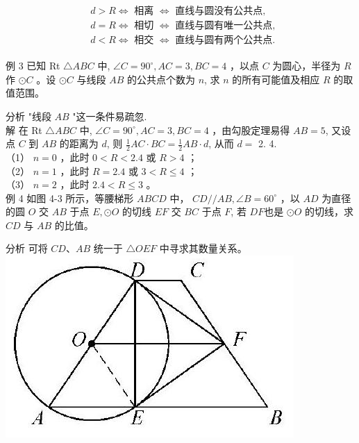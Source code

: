 \documentclass[10pt]{article}
\begin{document}
\begin{align*}
\begin{aligned}
& d>R \Leftrightarrow \text { 相离 } \Leftrightarrow \text { 直线与圆没有公共点, } \\
& d=R \Leftrightarrow \text { 相切 } \Leftrightarrow \text { 直线与圆有唯一公共点, } \\
& d<R \Leftrightarrow \text { 相交 } \Leftrightarrow \text { 直线与圆有两个公共点. }
\end{aligned}
\end{align*}

例 3 已知 Rt $\triangle A B C$ 中, $\angle C=90^{\circ}, A C=3, B C=4$ ，以点 $C$ 为圆心，半径为 $R$ 作 $\odot C$ 。设 $\odot C$ 与线段 $A B$ 的公共点个数为 $n$, 求 $n$ 的所有可能值及相应 $R$ 的取值范围。

分析 "线段 $A B$ "这一条件易疏忽.\\
解 在 Rt $\triangle A B C$ 中, $\angle C=90^{\circ}, A C=3, B C=4$ ，由勾股定理易得 $A B=5$, 又设点 $C$ 到 $A B$ 的距离为 $d$, 则 $\frac{1}{2} A C \cdot B C=\frac{1}{2} A B \cdot d$, 从而 $d=$ 2. 4.\\
（1） $n=0$ ，此时 $0<R<2.4$ 或 $R>4$ ；\\
（2） $n=1$ ，此时 $R=2.4$ 或 $3<R \leqslant 4$ ；\\
（3） $n=2$ ，此时 $2.4<R \leqslant 3$ 。\\
例 4 如图 4-3 所示，等腰梯形 $A B C D$ 中， $C D / / A B, \angle B=60^{\circ}$ ，以 $A D$ 为直径的圆 $O$ 交 $A B$ 于点 $E, \odot O$ 的切线 $E F$ 交 $B C$ 于点 $F$, 若 $D F$也是 $\odot O$ 的切线，求 $C D$ 与 $A B$ 的比值。

分析 可将 $C D 、 A B$ 统一于 $\triangle O E F$ 中寻求其数量关系。\\
\includegraphics[max width=\textwidth, center]{2024_10_30_66b8e5e701da2093c133g-030}
\end{document}
